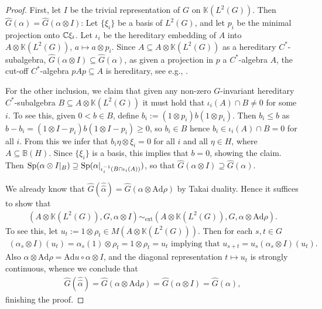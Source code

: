 \begin{proof}
	First, let $I$ be the trivial representation of $G$ on $\mathbb{K}(L^2(G))$. Then $\hat G(\alpha) = \hat G(\alpha \otimes I)$:
	Let $\{\xi_i\}$ be a basis of $L^2(G)$, and let $p_i$ be the minimal projection onto $\mathbb{C} \xi_i$. Let $\iota_i$ be the hereditary embedding of $A$ into $A \otimes \mathbb{K}(L^2(G))$, $a \mapsto a \otimes p_i$. Since $A \subseteq A \otimes \mathbb{K}(L^2(G))$ as a hereditary $C^*$-subalgebra, $\hat G(\alpha \otimes I) \subseteq \hat G(\alpha)$, as given a projection in $p$ a $C^*$-algebra $A$, the cut-off $C^*$-algebra $pAp \subseteq A$ is hereditary, see e.g., \cite[Example II.7.3.14]{blackadar}.
	
	For the other inclusion, we claim that given any non-zero $G$-invariant hereditary $C^*$-subalgebra $B \subseteq A \otimes \mathbb{K}(L^2(G))$ it must hold that $\iota_i(A) \cap B \neq 0$ for some $i$. To see this, given $0 < b \in B$, define $b_i := (1 \otimes p_i) b (1\otimes p_i)$. Then $b_i \leq b$ as $b-b_i = (1 \otimes I-p_i) b (1 \otimes I-p_i) \geq 0$, so $b_i \in B$ hence $b_i  \in \iota_i(A) \cap B= 0$ for all $i$. From this we infer that $b_i \eta \otimes \xi_i = 0$ for all $i$ and all $\eta \in H$, where $A \subseteq \mathbb{B}(H)$. Since $\{\xi_i\} $ is a basis, this implies that $b = 0$, showing the claim. Then $\mathrm{Sp}(\alpha \otimes I |_B) \supseteq \mathrm{Sp}( \alpha |_{\iota_i^{-1}(B \cap \iota_i(A))})$, so that $\hat G(\alpha \otimes I) \supseteq \hat G(\alpha)$.

	We already know that $\hat G(\hat{\hat \alpha}) = \hat G(\alpha \otimes \mathrm{Ad} \rho)$ by Takai duality. Hence it suffices to show that
	\begin{align*}
		(A \otimes \mathbb{K}(L^2(G)), G , \alpha \otimes I) \sim_{\mathrm{ext}} (A \otimes \mathbb{K}(L^2(G)), G , \alpha \otimes \mathrm{Ad} \rho).
	\end{align*}
	To see this, let $u_t := 1 \otimes \rho_t \in M(A \otimes \mathbb{K}(L^2(G)))$. Then for each $s,t \in G$
	\begin{align*}
		(\alpha_s \otimes I) (u_t) = \alpha_s(1) \otimes \rho_t = 1 \otimes \rho_t=u_t \text{ implying that } u_{s+t}= u_s (\alpha_s \otimes I)(u_t).
	\end{align*}
	Also $\alpha \otimes \mathrm{Ad} \rho = \mathrm{Ad} u \circ \alpha \otimes I$, and the diagonal representation $t \mapsto u_t$ is strongly continuous, whence we conclude that 
	\begin{align*}
		\hat G ( \hat {\hat \alpha}) = \hat G ( \alpha \otimes \mathrm{Ad} \rho) = \hat G( \alpha \otimes I) = \hat G( \alpha),
	\end{align*}
	finishing the proof.
\end{proof}
